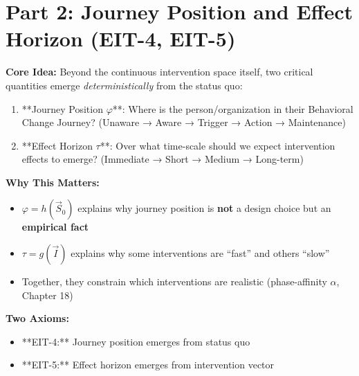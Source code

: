 
\section{Part 2: Journey Position and Effect Horizon (EIT-4, EIT-5)}
\label{sec:ie-part2-journey-horizon}

\begin{tcolorbox}[colback=blue!5!white, colframe=blue!75!black,
    title=\textbf{Part 2 Overview: How $\vec{S}_0$ Emerges into Journey Position and Effect Horizon}]

\textbf{Core Idea:} Beyond the continuous intervention space itself, two critical quantities emerge \textit{deterministically} from the status quo:
\begin{enumerate}[nosep]
\item **Journey Position $\varphi$**: Where is the person/organization in their Behavioral Change Journey? (Unaware → Aware → Trigger → Action → Maintenance)
\item **Effect Horizon $\tau$**: Over what time-scale should we expect intervention effects to emerge? (Immediate → Short → Medium → Long-term)
\end{enumerate}

\textbf{Why This Matters:}
\begin{itemize}[nosep]
\item $\varphi = h(\vec{S}_0)$ explains why journey position is \textbf{not} a design choice but an \textbf{empirical fact}
\item $\tau = g(\vec{I})$ explains why some interventions are ``fast'' and others ``slow''
\item Together, they constrain which interventions are realistic (phase-affinity $\alpha$, Chapter 18)
\end{itemize}

\textbf{Two Axioms:}
\begin{itemize}[nosep]
\item **EIT-4:** Journey position emerges from status quo
\item **EIT-5:** Effect horizon emerges from intervention vector
\end{itemize}

\end{tcolorbox}


